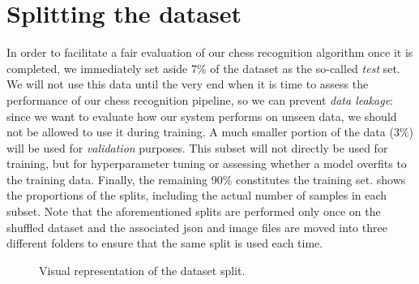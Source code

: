 \documentclass[../main.tex]{subfiles}
\begin{document}
\section{Splitting the dataset}
In order to facilitate a fair evaluation of our chess recognition algorithm once it is completed, we immediately set aside 7\% of the dataset as the so-called \emph{test} set.
We will not use this data until the very end when it is time to assess the performance of our chess recognition pipeline, so we can prevent \emph{data leakage}: since we want to evaluate how our system performs on unseen data, we should not be allowed to use it during training.
A much smaller portion of the data (3\%) will be used for \emph{validation} purposes.
This subset will not directly be used for training, but for hyperparameter tuning or assessing whether a model overfits to the training data.
Finally, the remaining 90\% constitutes the training set.
 shows the proportions of the splits, including the actual number of samples in each subset.
Note that the aforementioned splits are performed only once on the shuffled dataset and the associated \gls{json} and image files are moved into three different folders to ensure that the same split is used each time.

\begin{figure}
    \caption{Visual representation of the dataset split.}
    \label{fig:dataset_split}
\end{figure}
\end{document}

